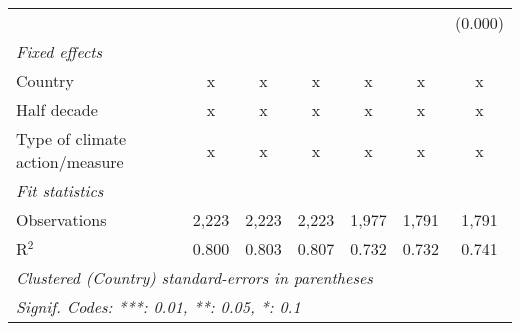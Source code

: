 \begin{tabular}{lcccccc}
                                                 &         &               &                &                &               & (0.000)\\   
   \emph{Fixed effects}\\
   Country                                       & x       & x             & x              & x              & x             & x\\  
   Half decade                                   & x       & x             & x              & x              & x             & x\\  
   Type of climate action/measure                & x       & x             & x              & x              & x             & x\\  
   \midrule \emph{Fit statistics}\\
   Observations                                  & 2,223   & 2,223         & 2,223          & 1,977          & 1,791         & 1,791\\  
   R$^2$                                         & 0.800   & 0.803         & 0.807          & 0.732          & 0.732         & 0.741\\  
   \midrule
   \multicolumn{7}{l}{\emph{Clustered (Country) standard-errors in parentheses}}\\
   \multicolumn{7}{l}{\emph{Signif. Codes: ***: 0.01, **: 0.05, *: 0.1}}\\
\end{tabular}
\par\endgroup


